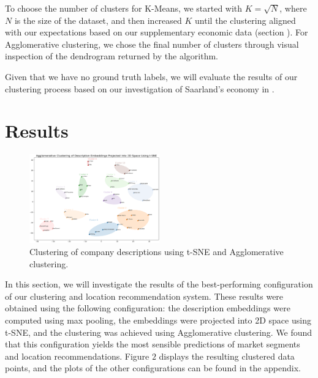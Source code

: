 \documentclass[conference]{IEEEtran}
\begin{document}
To choose the number of clusters for K-Means, we started with $K = \sqrt{N}$, where $N$ is the size of the dataset, and then increased $K$ until the clustering aligned with our expectations based on our supplementary economic data (section \MakeUppercase{}). For Agglomerative clustering, we chose the final number of clusters through visual inspection of the dendrogram returned by the algorithm.

Given that we have no ground truth labels, we will evaluate the results of our clustering process based on our investigation of Saarland's economy in \MakeUppercase{}.

\section{Results}
\begin{figure}[H]
    \centering
    \includegraphics[width=0.5\textwidth]{figures/clustering_tsne.png}
    \caption{Clustering of company descriptions using t-SNE and Agglomerative clustering.}
    \label{fig:t-sne-agglomerative}
\end{figure}

In this section, we will investigate the results of the best-performing configuration of our clustering and location recommendation system. These results were obtained using the following configuration: the description embeddings were computed using max pooling, the embeddings were projected into 2D space using t-SNE, and the clustering was achieved using Agglomerative clustering. We found that this configuration yields the most sensible predictions of market segments and location recommendations. Figure \hyperref[fig:t-sne-agglomerative]{$2$} displays the resulting clustered data points, and the plots of the other configurations can be found in the appendix.
\end{document}
